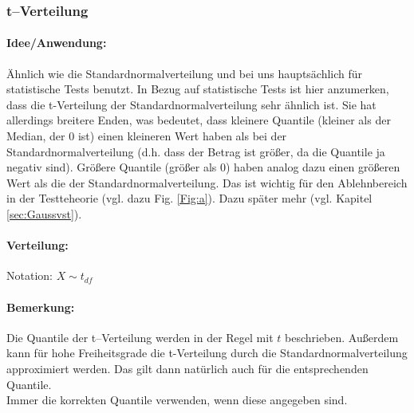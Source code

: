 \documentclass[a4paper]{article}
\newcommand\dangersign{%
 \makebox[1.8em][c]{%
 \makebox[0pt][c]{\raisebox{.15em}{\small!}}%
 \makebox[0pt][c]{\color{red}\Large$\triangle$}}}%
\begin{document}
\noindent {}


\subsubsection{t--Verteilung} \label{sec:tdistr}

\paragraph{Idee/Anwendung:} Ähnlich wie die Standardnormalverteilung und bei uns hauptsächlich für statistische Tests benutzt. In Bezug auf statistische Tests ist hier anzumerken, dass die t-Verteilung der Standardnormalverteilung sehr ähnlich ist. Sie hat allerdings breitere Enden, was bedeutet, dass kleinere Quantile (kleiner als der Median, der $0$ ist) einen kleineren Wert haben als bei der Standardnormalverteilung (d.h. dass der Betrag ist größer, da die Quantile ja negativ sind). Größere Quantile (größer als $0$) haben analog dazu einen größeren Wert als die der Standardnormalverteilung. Das ist wichtig für den Ablehnbereich in der Testteheorie (vgl. dazu Fig. \ref{Fig:a}). Dazu später mehr (vgl. Kapitel \ref{sec:Gaussvst}).

\paragraph{Verteilung:}Notation: $X \sim t_{df}$

\paragraph{Bemerkung:} Die Quantile der t--Verteilung werden in der Regel mit $t$ beschrieben. Außerdem kann für hohe Freiheitsgrade die t-Verteilung durch die Standardnormalverteilung approximiert werden. Das gilt dann natürlich auch für die entsprechenden Quantile. \\

\noindent \dangersign Immer die korrekten Quantile verwenden, wenn diese angegeben sind. \\
\end{document}
